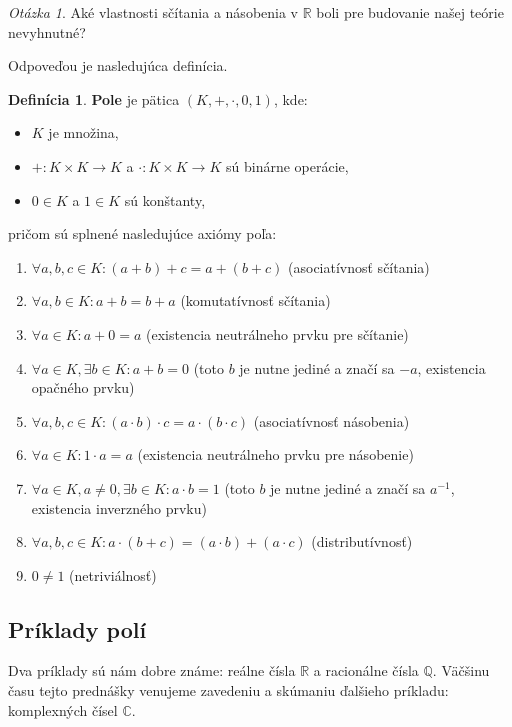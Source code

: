 \documentclass[11pt,a4paper]{article}
\theoremstyle{definition}
\newtheorem{definicia}{Definícia}[section]
\theoremstyle{plain}
\theoremstyle{remark}
\newtheorem*{question}{Otázka}
\newcommand{\R}{\mathbb{R}}
\begin{document}
\begin{question}
Aké vlastnosti sčítania a násobenia v $\R$ boli pre budovanie našej teórie nevyhnutné?
\end{question}
Odpoveďou je nasledujúca definícia.

\begin{definicia}
\textbf{Pole} je pätica $(K, +, \cdot, 0, 1)$, kde:
\begin{itemize}
    \item $K$ je množina,
    \item $+: K \times K \to K$ a $\cdot: K \times K \to K$ sú binárne operácie,
    \item $0 \in K$ a $1 \in K$ sú konštanty,
\end{itemize}
pričom sú splnené nasledujúce axiómy poľa:
\begin{enumerate}
    \item $\forall a,b,c \in K: (a+b)+c = a+(b+c)$ (asociatívnosť sčítania)
    \item $\forall a,b \in K: a+b = b+a$ (komutatívnosť sčítania)
    \item $\forall a \in K: a+0 = a$ (existencia neutrálneho prvku pre sčítanie)
    \item $\forall a \in K, \exists b \in K: a+b=0$ (toto $b$ je nutne jediné a značí sa $-a$, existencia opačného prvku)
    \item $\forall a,b,c \in K: (a \cdot b) \cdot c = a \cdot (b \cdot c)$ (asociatívnosť násobenia)
    \item $\forall a \in K: 1 \cdot a = a$ (existencia neutrálneho prvku pre násobenie)
    \item $\forall a \in K, a \neq 0, \exists b \in K: a \cdot b = 1$ (toto $b$ je nutne jediné a značí sa $a^{-1}$, existencia inverzného prvku)
    \item $\forall a,b,c \in K: a \cdot (b+c) = (a \cdot b) + (a \cdot c)$ (distributívnosť)
    \item $0 \neq 1$ (netriviálnosť)
\end{enumerate}
\end{definicia}

\subsection*{Príklady polí}
Dva príklady sú nám dobre známe: reálne čísla $\R$ a racionálne čísla $\mathbb{Q}$. Väčšinu času tejto prednášky venujeme zavedeniu a skúmaniu ďalšieho príkladu: komplexných čísel $\mathbb{C}$.
\end{document}
